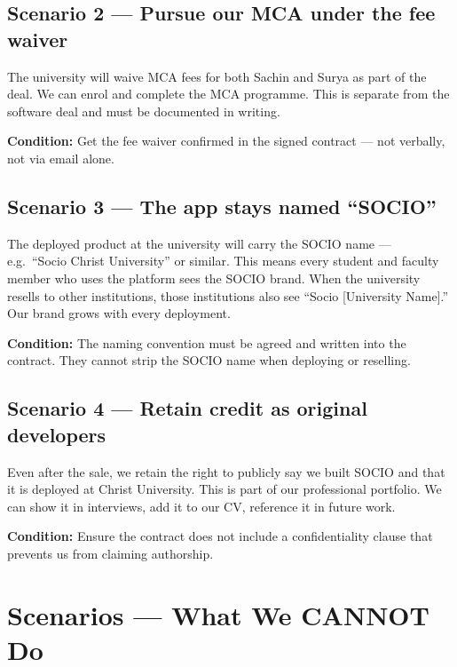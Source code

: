 \documentclass[12pt,a4paper]{article}
\begin{document}
\subsection{Scenario 2 — Pursue our MCA under the fee waiver}

The university will waive MCA fees for both Sachin and Surya as part of the deal. We can enrol and complete the MCA programme. This is separate from the software deal and must be documented in writing.

\textbf{Condition:} Get the fee waiver confirmed in the signed contract — not verbally, not via email alone.

\vspace{0.3cm}

\subsection{Scenario 3 — The app stays named ``SOCIO''}

The deployed product at the university will carry the SOCIO name — e.g.\ ``Socio Christ University'' or similar. This means every student and faculty member who uses the platform sees the SOCIO brand. When the university resells to other institutions, those institutions also see ``Socio [University Name].'' Our brand grows with every deployment.

\textbf{Condition:} The naming convention must be agreed and written into the contract. They cannot strip the SOCIO name when deploying or reselling.

\vspace{0.3cm}

\subsection{Scenario 4 — Retain credit as original developers}

Even after the sale, we retain the right to publicly say we built SOCIO and that it is deployed at Christ University. This is part of our professional portfolio. We can show it in interviews, add it to our CV, reference it in future work.

\textbf{Condition:} Ensure the contract does not include a confidentiality clause that prevents us from claiming authorship.

\newpage
\section{Scenarios — What We CANNOT Do}
\end{document}
